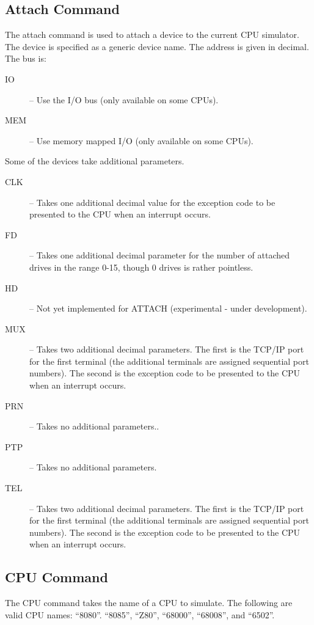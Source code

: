 \documentclass[10pt, openany]{book}
\begin{document}
\subsection{Attach Command}
\label{cli:Attach}
The attach command is used to attach a device to the current CPU simulator.  The device is specified as a generic device name.  The address is given in decimal.  The bus is:
\begin{description}
  \item[IO] -- Use the I/O bus (only available on some CPUs).
  \item[MEM] -- Use memory mapped I/O (only available on some CPUs).
\end{description}
Some of the devices take additional parameters.
\begin{description}
  \item[CLK] -- Takes one additional decimal value for the exception code to be presented to the CPU when an interrupt occurs.
  \item[FD] -- Takes one additional decimal parameter for the number of attached drives in the range 0-15, though 0 drives is rather pointless.
  \item[HD] -- Not yet implemented for ATTACH (experimental - under development).
  \item[MUX] -- Takes two additional decimal parameters.  The first is the TCP/IP port for the first terminal (the additional terminals are assigned sequential port numbers).  The second is the exception code to be presented to the CPU when an interrupt occurs.
  \item[PRN] -- Takes no additional parameters..
  \item[PTP] -- Takes no additional parameters.
  \item[TEL] --  Takes two additional decimal parameters.  The first is the TCP/IP port for the first terminal (the additional terminals are assigned sequential port numbers).  The second is the exception code to be presented to the CPU when an interrupt occurs.
\end{description}

\subsection{CPU Command}
The CPU command takes the name of a CPU to simulate.  The following are valid CPU names:  ``8080''. ``8085'', ``Z80'', ``68000'', ``68008'', and ``6502''.
\end{document}
